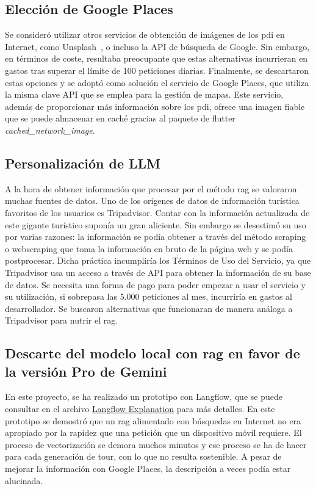 \subsection{Elección de Google Places}
Se consideró utilizar otros servicios de obtención de imágenes de los \acrshort{pdi} en Internet, como Unsplash~\cite{unsplash}, o incluso la API de búsqueda de Google. Sin embargo, en términos de coste, resultaba preocupante que estas alternativas incurrieran en gastos tras superar el límite de 100 peticiones diarias. Finalmente, se descartaron estas opciones y se adoptó como solución el servicio de Google Places, que utiliza la misma clave API que se emplea para la gestión de mapas. Este servicio, además de proporcionar más información sobre los \acrlong{pdi}, ofrece una imagen fiable que se puede almacenar en caché gracias al paquete de flutter \textit{cached\_network\_image}.

\subsection{Personalización de LLM}
A la hora de obtener información que procesar por el método \acrshort{rag} se valoraron muchas fuentes de datos. Uno de los origenes de datos de información turística favoritos de los usuarios es Tripadvisor. Contar con la información actualizada de este gigante turístico suponía un gran aliciente. Sin embargo se desestimó su uso por varias razones: la información se podía obtener a través del método scraping o webscraping que toma la información en bruto de la página web y se podía postprocesar. Dicha práctica incumpliría los Términos de Uso del Servicio, ya que Tripadvisor usa un acceso a través de API para obtener la información de su base de datos. Se necesita una forma de pago para poder empezar a usar el servicio y su utilización, si sobrepasa las 5.000 peticiones al mes, incurriría en gastos al desarrollador. Se buscaron alternativas que funcionaran de manera análoga a Tripadvisor para nutrir el \acrshort{rag}.

\subsection{Descarte del modelo local con \acrshort{rag} en favor de la versión Pro de Gemini}

En este proyecto, se ha realizado un prototipo con Langflow, que se puede consultar en el archivo \href{https://github.com/fps1001/TFGII_FPisot/blob/main/project-prototypes/Langflow_explanation.md}{Langflow Explanation} para más detalles. En este prototipo se 
demostró que un \acrshort{rag} alimentado con búsquedas en Internet no era apropiado por la rapidez que una petición que un dispositivo móvil requiere. El proceso de vectorización se demora muchos minutos y ese proceso se ha de hacer para cada generación de tour, con lo que no resulta sostenible. A pesar de mejorar la información con Google Places, la descripción a veces podía estar alucinada. 

